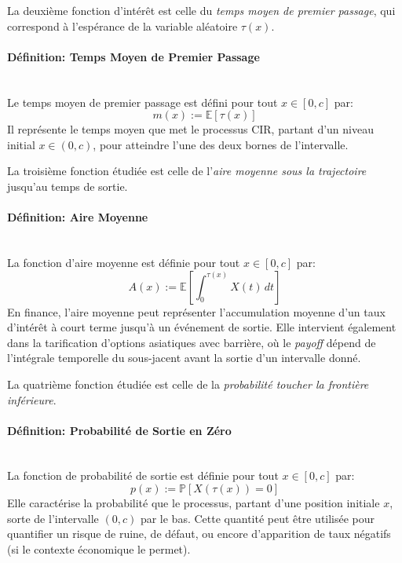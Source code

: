 La deuxième fonction d'intérêt est celle du \textit{temps moyen de premier passage}, qui correspond à l'espérance de la variable aléatoire $\tau(x)$.
\paragraph{Définition: Temps Moyen de Premier Passage}\mbox{}\\
Le temps moyen de premier passage est défini pour tout \(x\in[0,c]\) par:
\begin{equation}\label{mean}
    m(x):= \mathds{E}[\tau(x)]
\end{equation}
Il représente le temps moyen que met le processus \acs{CIR}, partant d'un niveau initial $x \in (0,c)$, pour atteindre l'une des deux bornes de l'intervalle.

La troisième fonction étudiée est celle de l'\textit{aire moyenne sous la trajectoire} jusqu'au temps de sortie.
\paragraph{Définition: Aire Moyenne}\mbox{}\\
La fonction d'aire moyenne est définie pour tout \(x\in[0,c]\) par:
\begin{equation}\label{area}
    A(x):= \mathds{E} \left[ \int_0^{\tau(x)} X(t)\,dt \right]
\end{equation}
En finance, l'aire moyenne peut représenter l'accumulation moyenne d'un taux d'intérêt à court terme jusqu'à un événement de sortie. Elle intervient également dans la tarification d'options asiatiques avec barrière, où le \textit{payoff} dépend de l'intégrale temporelle du sous-jacent avant la sortie d'un intervalle donné.

La quatrième fonction étudiée est celle de la \textit{probabilité toucher la frontière inférieure}.
\paragraph{Définition: Probabilité de Sortie en Zéro}\mbox{}\\
La fonction de probabilité de sortie est définie pour tout \(x\in[0,c]\) par:
\begin{equation}\label{zero_exit_probability}
    p(x):=\mathds{P}[X(\tau(x))=0]
\end{equation}
Elle caractérise la probabilité que le processus, partant d'une position initiale $x$, sorte de l'intervalle $(0,c)$ par le bas. Cette quantité peut être utilisée pour quantifier un risque de ruine, de défaut, ou encore d'apparition de taux négatifs (si le contexte économique le permet).

